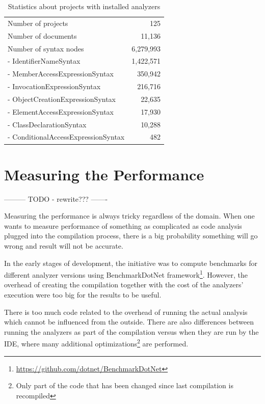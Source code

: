 \documentclass[
  digital, %
  table,   %
  lof,     %
  lot,     %
  oneside,
]{fithesis3}
\begin{document}
\begin{table}
\begin{tabularx}{\textwidth}{Xr}
\toprule
Number of projects                  & 125 \\
Number of documents              & 11,136 \\
Number of syntax nodes        & 6,279,993 \\
- IdentifierNameSyntax        & 1,422,571 \\
- MemberAccessExpressionSyntax  & 350,942 \\
- InvocationExpressionSyntax     & 216,716 \\
- ObjectCreationExpressionSyntax & 22,635 \\ 
- ElementAccessExpressionSyntax  & 17,930 \\
- ClassDeclarationSyntax         & 10,288 \\ 
- ConditionalAccessExpressionSyntax & 482 \\

\bottomrule

\end{tabularx}
\caption{Statistics about projects with installed analyzers}
\label{tab:solution-statistics}
\end{table}

\section{Measuring the Performance}
--------- TODO - rewrite??? -------

Measuring the performance is always tricky regardless of the domain. When one wants to measure performance of something as complicated as code analysis plugged into the compilation process, there is a big probability something will go wrong and result will not be accurate.

In the early stages of development, the initiative was to compute benchmarks for different analyzer versions using BenchmarkDotNet framework\footnote{\url{https://github.com/dotnet/BenchmarkDotNet}}. However, the overhead of creating the compilation together with the cost of the analyzers' execution were too big for the results to be useful. 

There is too much code related to the overhead of running the actual analysis which cannot be influenced from the outside. There are also differences between running the analyzers as part of the compilation versus when they are run by the IDE, where many additional optimizations\footnote{Only part of the code that has been changed since last compilation is recompiled} are performed. 
\end{document}

